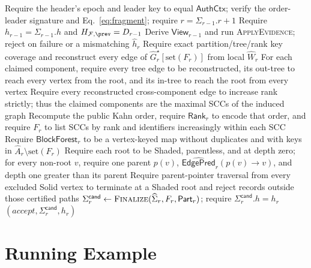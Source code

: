 \begin{algorithm}[h!]
\caption{\textsc{VerifyFragment}: Expanded Verification}
\label{alg:verify-fragment-expanded}
\footnotesize
{}
Require the header's epoch and leader key to equal $\mathsf{AuthCtx}$; verify
the order-leader signature and Eq.~\eqref{eq:fragment}; require
$r=\Sigma_{r-1}.r+1$\;
Require $h_{r-1}=\Sigma_{r-1}.h$ and
$H_{\mathcal F,\prev}=D_{r-1}$\;
Derive $\mathsf{View}_{r-1}$ and run
\textsc{ApplyEvidence}; reject on failure or a mismatching $\widehat h_r$\;
Require exact partition/tree/rank key coverage and reconstruct every edge of $\widehat G_r^\star[\mathrm{set}(F_r)]$ from local $\widehat W_r$\;
For each claimed component, require every tree edge to be reconstructed, its out-tree to reach every vertex from the root, and its in-tree to reach the root from every vertex\;
Require every reconstructed cross-component edge to increase rank strictly; thus the claimed components are the maximal SCCs of the induced graph\;
Recompute the public Kahn order, require $\mathsf{Rank}_r$ to encode that order, and require $F_r$ to list SCCs by rank and identifiers increasingly within each SCC\;
Require $\mathsf{BlockForest}_r$ to be a vertex-keyed map without duplicates and with keys in
$\widehat A_r\setminus\mathrm{set}(F_r)$\;
Require each root to be Shaded, parentless, and at depth zero; for every non-root $v$, require one parent $p(v)$,
$\widehat{\mathsf{EdgePred}}_r(p(v)\to v)$, and depth one greater than its parent\;
Require parent-pointer traversal from every excluded Solid vertex to terminate at a Shaded root and reject records outside those certified paths\;
$\Sigma_r^{\mathsf{cand}}\gets
  \textsc{Finalize}(\widehat\Sigma_r,F_r,\mathsf{Part}_r)$;
require $\Sigma_r^{\mathsf{cand}}.h=h_r$\;
\KwRet $(accept,\Sigma_r^{\mathsf{cand}},h_r)$
\end{algorithm}

\section{Running Example}
\label{app:running-example}

